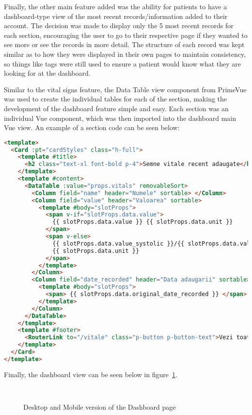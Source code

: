 Finally, the other main feature added was the ability for patients to have a dashboard-type view of the most recent records/information added to their account. The decision was made to display only the 5 most recent records for each section, encouraging the user to go to their respective page if they wanted to see more or see the records in more detail. The structure of each record was kept similar as to how they were displayed in their own pages to maintain consistency, so things like tags were still used to ensure a patient would know what they are looking for at the dashboard.

Similar to the vital signs feature, the Data Table view component from PrimeVue was used to create the individual tables for each of the section, making the development of the dashboard feature simple and easy. Each section was an individual Vue component, which was then imported into the dashboard main Vue view. An example of a section code can be seen below:

\begin{lstlisting}[language=HTML, caption=Vital Signs Dashboard Section Component]
<template>
  <Card :pt="cardStyles" class="h-full">
    <template #title>
      <h2 class="text-xl font-bold p-4">Semne vitale recent adaugate</h2>
    </template>
    <template #content>
      <DataTable :value="props.vitals" removableSort>
        <Column field="name" header="Numele" sortable> </Column>
        <Column field="value" header="Valoarea" sortable>
          <template #body="slotProps">
            <span v-if="slotProps.data.value">
              {{ slotProps.data.value }} {{ slotProps.data.unit }}
            </span>
            <span v-else>
              {{ slotProps.data.value_systolic }}/{{ slotProps.data.value_diastolic }}
              {{ slotProps.data.unit }}
            </span>
          </template>
        </Column>
        <Column field="date_recorded" header="Data adaugarii" sortable>
          <template #body="slotProps">
            <span> {{ slotProps.data.original_date_recorded }} </span>
          </template>
        </Column>
      </DataTable>
    </template>
    <template #footer>
      <RouterLink to="/vitale" class="p-button p-button-text">Vezi toate semnele vitale</RouterLink>
    </template>
  </Card>
</template>
\end{lstlisting}

Finally, the dashboard view can be seen below in figure~\ref{fig:dashboardpage}.

\begin{figure}[ht]
  \centering
  \\[\baselineskip]
  \caption{Desktop and Mobile version of the Dashboard page}\label{fig:dashboardpage}
\end{figure}

